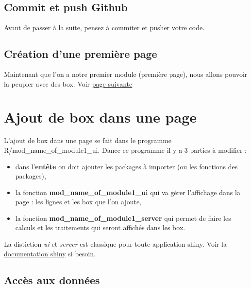 \documentclass[
  letterpaper,
  DIV=11,
  numbers=noendperiod]{scrreprt}
\providecommand{\tightlist}{%
  \setlength{\itemsep}{0pt}\setlength{\parskip}{0pt}}\usepackage{longtable,booktabs,array}
\begin{document}
\hypertarget{commit-et-push-github}{%
\section{Commit et push Github}\label{commit-et-push-github}}

Avant de passer à la suite, pensez à commiter et pusher votre code.

\hypertarget{cruxe9ation-dune-premiuxe8re-page}{%
\section{Création d'une première
page}\label{cruxe9ation-dune-premiuxe8re-page}}

Maintenant que l'on a notre premier module (première page), nous allons
pouvoir la peupler avec des box. Voir
\protect\hyperlink{ajout-de-box-dans-une-page}{page suivante}


\hypertarget{ajout-de-box-dans-une-page}{%
\chapter{Ajout de box dans une page}\label{ajout-de-box-dans-une-page}}

L'ajout de box dans une page se fait dans le programme
R/mod\_name\_of\_module1\_ui. Dance ce programme il y a 3 parties à
modifier :

\begin{itemize}
\tightlist
\item
  dans l'\textbf{entête} on doit ajouter les packages à importer (ou les
  fonctions des packages),\\
\item
  la fonction \textbf{mod\_name\_of\_module1\_ui} qui va gérer
  l'affichage dans la page : les lignes et les box que l'on ajoute,\\
\item
  la fonction \textbf{mod\_name\_of\_module1\_server} qui permet de
  faire les calculs et les traitements qui seront affichés dans les box.
\end{itemize}

La distiction \emph{ui} et \emph{server} est classique pour toute
application shiny. Voir la
\href{https://shiny.posit.co/r/getstarted/shiny-basics/lesson1/}{documentation
shiny} si besoin.

\hypertarget{accuxe8s-aux-donnuxe9es}{%
\section{Accès aux données}\label{accuxe8s-aux-donnuxe9es}}
\end{document}
